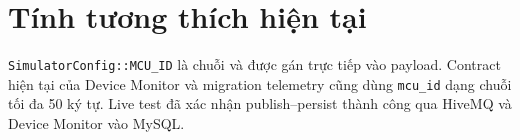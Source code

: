 \section{Tính tương thích hiện tại}

\texttt{SimulatorConfig::MCU\_ID} là chuỗi và được gán trực tiếp vào payload.
Contract hiện tại của Device Monitor và migration telemetry cũng dùng \texttt{mcu\_id}
dạng chuỗi tối đa 50 ký tự. Live test đã xác nhận publish--persist thành công qua
HiveMQ và Device Monitor vào MySQL.
